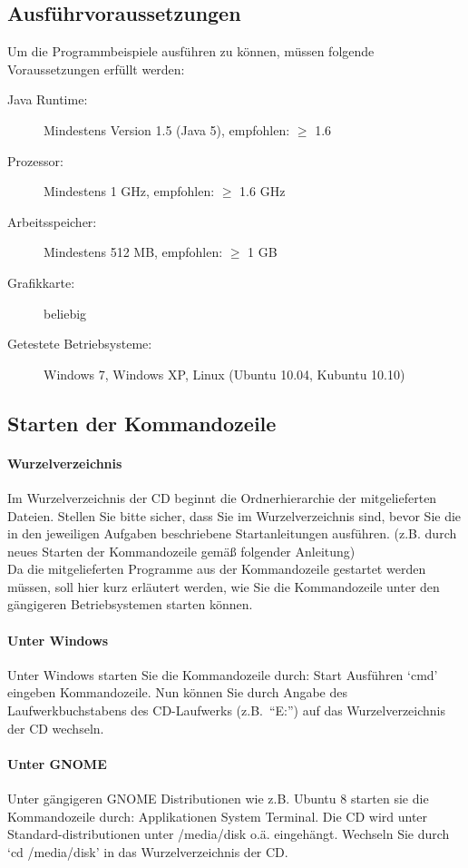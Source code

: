 \documentclass[a4paper,11pt]{scrartcl}
\begin{document}
\subsection{Ausführvoraussetzungen}
\label{Vor}
Um die Programmbeispiele ausführen zu können, müssen folgende Voraussetzungen erfüllt werden:
\begin{description}
 \item[Java Runtime:] Mindestens Version 1.5 (Java 5), empfohlen: $\geq$ 1.6 
 \item[Prozessor:] Mindestens 1 GHz, empfohlen: $\geq$ 1.6 GHz
 \item[Arbeitsspeicher:] Mindestens 512 MB, empfohlen: $\geq$ 1 GB
 \item[Grafikkarte:] beliebig
 \item[Getestete Betriebsysteme:] Windows 7, Windows XP, Linux (Ubuntu 10.04, Kubuntu 10.10)
\end{description}
\subsection{Starten der Kommandozeile}
\paragraph{Wurzelverzeichnis} Im Wurzelverzeichnis der CD beginnt die Ordnerhierarchie der mitgelieferten Dateien.
Stellen Sie bitte sicher, dass Sie im Wurzelverzeichnis sind, bevor Sie die in den jeweiligen Aufgaben beschriebene Startanleitungen ausführen.
(z.B. durch neues Starten der Kommandozeile gemäß folgender Anleitung)\\
Da die mitgelieferten Programme aus der Kommandozeile gestartet werden müssen, soll hier kurz erläutert werden,
wie Sie die Kommandozeile unter den gängigeren Betriebsystemen starten können.
\newcommand{\then}{\textrightarrow{} }
\paragraph{Unter Windows}
Unter Windows starten Sie die Kommandozeile durch: Start \then Ausführen \then `cmd' eingeben \then Kommandozeile.
Nun können Sie durch Angabe des Laufwerkbuchstabens des CD-Laufwerks (z.B.\ ``E:'') auf das Wurzelverzeichnis der CD wechseln.
\paragraph{Unter GNOME}
Unter gängigeren GNOME Distributionen wie z.B. Ubuntu 8 starten sie die Kommandozeile durch:
Applikationen \then System \then Terminal.
Die CD wird unter Standard-distributionen unter /media/disk o.ä. eingehängt. Wechseln Sie durch `cd /media/disk' in das Wurzelverzeichnis der CD.
\end{document}
